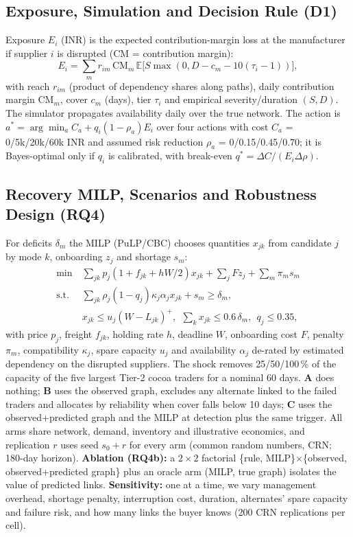 \documentclass[conference]{IEEEtran}
\begin{document}
\subsection{Exposure, Simulation and Decision Rule (D1)}
Exposure $E_i$ (INR) is the expected contribution-margin loss at the manufacturer if supplier $i$ is disrupted (CM = contribution margin):
\begin{equation}\label{eq:exposure}
E_i=\textstyle\sum_m r_{im}\,\mathrm{CM}_m\,\mathbb{E}\big[S\max(0,D-c_m-10(\tau_i-1))\big],
\end{equation}
with reach $r_{im}$ (product of dependency shares along paths), daily contribution margin $\mathrm{CM}_m$, cover $c_m$ (days), tier $\tau_i$ and
empirical severity/duration $(S,D)$. The simulator propagates availability daily over the true network. The action is $a^*=\arg\min_a C_a+q_i(1-\rho_a)E_i$ over four actions with cost $C_a$ = 0/5k/20k/60k INR and
assumed risk reduction $\rho_a$ = 0/0.15/0.45/0.70; it is Bayes-optimal only if $q_i$ is calibrated, with break-even $q^*=\Delta C/(E_i\Delta\rho)$.

\subsection{Recovery MILP, Scenarios and Robustness Design (RQ4)}
For deficits $\delta_m$ the MILP (PuLP/CBC) chooses quantities $x_{jk}$ from candidate $j$ by mode $k$, onboarding $z_j$ and shortage $s_m$:
\begin{align}
\min\ &\textstyle\sum_{jk}p_j(1+f_{jk}+hW/2)x_{jk}+\sum_jFz_j+\sum_m\pi_ms_m\\
\text{s.t. }&\textstyle\sum_{jk}\rho_j(1-q_j)\kappa_j\alpha_jx_{jk}+s_m\ge\delta_m,\nonumber\\
&x_{jk}\le u_j(W-L_{jk})^+,\ \ \textstyle\sum_kx_{jk}\le0.6\,\delta_m,\ \ q_j\le0.35,\nonumber
\end{align}
with price $p_j$, freight $f_{jk}$, holding rate $h$, deadline $W$, onboarding cost $F$, penalty $\pi_m$, compatibility $\kappa_j$, spare capacity
$u_j$ and availability $\alpha_j$ de-rated by estimated dependency on the disrupted suppliers. The shock removes 25/50/100\,\% of the capacity of
the five largest Tier-2 cocoa traders for a nominal 60 days. \textbf{A} does nothing; \textbf{B} uses the observed graph, excludes any alternate
linked to the failed traders and allocates by reliability when cover falls below 10 days; \textbf{C} uses the observed+predicted graph and the
MILP at detection plus the same trigger. All arms share network, demand, inventory and illustrative economics, and replication $r$ uses seed
$s_0+r$ for every arm (common random numbers, CRN; 180-day horizon). \textbf{Ablation (RQ4b):} a $2\times2$ factorial \{rule, MILP\}$\times$\{observed,
observed+predicted graph\} plus an oracle arm (MILP, true graph) isolates the value of predicted links. \textbf{Sensitivity:} one at a time, we
vary management overhead, shortage penalty, interruption cost, duration, alternates' spare capacity and failure risk, and how many links the
buyer knows (200 CRN replications per cell).
\end{document}
